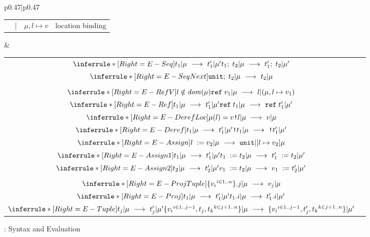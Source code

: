 \begin{figure*}[h]
\begin{tabular}{p{}|p{}}
\begin{tabular}{r@{\hspace{0.5em}}r@{\hspace{0.5em}}l@{\hspace{0.5em}}r}
            & |   & $\mu, l \mapsto v$          & location binding    \\
    \end{tabular}
    &
    \renewcommand{\arraystretch}{2.5}
    \begin{tabular}{cr}
        $\inferrule*[Right=E-Seq] 
            {t_1 | \mu\ \longrightarrow\ t'_1 | \mu'}
            {\seq{t_1}{t_2} | \mu\ \longrightarrow\ \seq{t'_1}{t_2} | \mu'}$ & \\
        $\inferrule*[Right=E-SeqNext] 
            { }
            {\seq{\unit}{t_2} | \mu\ \longrightarrow\ t_2 | \mu}$ & \\
         & \\
        $\inferrule*[Right=E-RefV] 
            {l \notin \mathit{dom}(\mu)}
            {\refr{v_1} | \mu\ \longrightarrow\ l | (\mu, l \mapsto v_1)}$ & \\
        $\inferrule*[Right=E-Ref] 
            {t_1 | \mu\ \longrightarrow\ t'_1 | \mu'}
            {\refr{t_1} | \mu\ \longrightarrow\ \refr{t'_1} | \mu'}$ & \\
        $\inferrule*[Right=E-DerefLoc] 
            {\mu(l) = v}
            {\deref{l} | \mu\ \longrightarrow\ v | \mu}$ & \\
        $\inferrule*[Right=E-Deref] 
            {t_1 | \mu\ \longrightarrow\ t'_1 | \mu'}
            {\deref{t_1} | \mu\ \longrightarrow\ \deref{t'_1} | \mu'}$ & \\
        $\inferrule*[Right=E-Assign] 
            { }
            {\assign{l}{v_2} | \mu\ \longrightarrow\ \unit | [l \mapsto v_2]\mu}$ & \\
        $\inferrule*[Right=E-Assign1] 
            {t_1 | \mu\ \longrightarrow\ t'_1 | \mu'}
            {\assign{t_1}{t_2} | \mu\ \longrightarrow\ \assign{t'_1}{t_2} | \mu'}$ & \\
        $\inferrule*[Right=E-Assign2] 
            {t_2 | \mu\ \longrightarrow\ t'_2 | \mu'}
            {\assign{v_1}{t_2} | \mu\ \longrightarrow\ \assign{v_1}{t'_2} | \mu'}$ & \\
         & \\
        $\inferrule*[Right=E-ProjTuple] 
            { }
            {\proj{\Tuple{{v_i}^{i\in 1..n}}}{j} | \mu\ \longrightarrow\ v_j | \mu}$ & \\
        $\inferrule*[Right=E-Proj] 
            {t_1 | \mu\ \longrightarrow\ t'_1 | \mu'}
            {\proj{t_1}{i} | \mu\ \longrightarrow\ \proj{t'_1}{i} | \mu'}$ & \\
        $\inferrule*[Right=E-Tuple] 
            {t_j | \mu\ \longrightarrow\ t'_j | \mu'}
            {\Tuple{{v_i}^{i\in 1..j-1}, t_j, {t_k}^{k\in j+1..n}} | \mu \\
               \ \longrightarrow\ \Tuple{{v_i}^{i\in 1..j-1}, t'_j, {t_k}^{k\in j+1..n}} | \mu'}$ & \\
    \end{tabular}
\end{tabular}
\caption{: Syntax and Evaluation}
\label{fig:language-definition-typedlambdaref}
\end{figure*}





